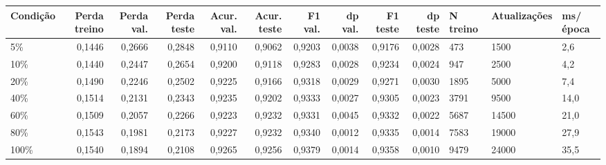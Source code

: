 \begin{tabular}{lrrrrrrrrrlll}
\toprule
Condição & Perda treino & Perda val. & Perda teste & Acur. val. & Acur. teste & F1 val. & dp val. & F1 teste & dp teste & N treino & Atualizações & ms/época \\
\midrule
5\% & 0,1446 & 0,2666 & 0,2848 & 0,9110 & 0,9062 & 0,9203 & 0,0038 & 0,9176 & 0,0028 & 473 & 1500 & 2,6 \\
10\% & 0,1440 & 0,2447 & 0,2654 & 0,9200 & 0,9118 & 0,9283 & 0,0028 & 0,9234 & 0,0024 & 947 & 2500 & 4,2 \\
20\% & 0,1490 & 0,2246 & 0,2502 & 0,9225 & 0,9166 & 0,9318 & 0,0029 & 0,9271 & 0,0030 & 1895 & 5000 & 7,4 \\
40\% & 0,1514 & 0,2131 & 0,2343 & 0,9235 & 0,9202 & 0,9333 & 0,0027 & 0,9305 & 0,0023 & 3791 & 9500 & 14,0 \\
60\% & 0,1509 & 0,2057 & 0,2266 & 0,9223 & 0,9232 & 0,9331 & 0,0045 & 0,9332 & 0,0022 & 5687 & 14500 & 21,0 \\
80\% & 0,1543 & 0,1981 & 0,2173 & 0,9227 & 0,9232 & 0,9340 & 0,0012 & 0,9335 & 0,0014 & 7583 & 19000 & 27,9 \\
100\% & 0,1540 & 0,1894 & 0,2108 & 0,9265 & 0,9256 & 0,9379 & 0,0014 & 0,9358 & 0,0010 & 9479 & 24000 & 35,5 \\
\bottomrule
\end{tabular}
